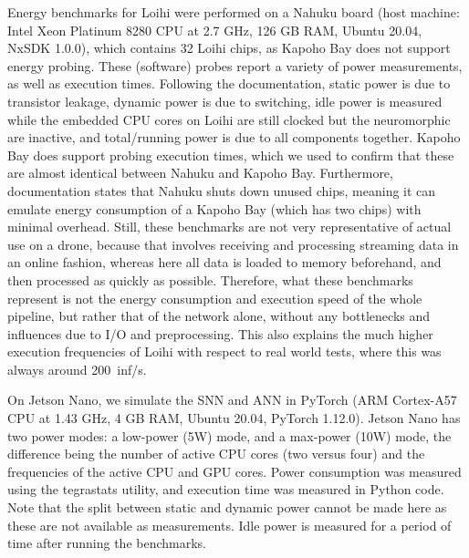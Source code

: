 Energy benchmarks for Loihi were performed on a Nahuku board (host machine: Intel Xeon Platinum 8280 CPU at 2.7 GHz, 126 GB RAM, Ubuntu 20.04, NxSDK 1.0.0), which contains 32 Loihi chips, as Kapoho Bay does not support energy probing. These (software) probes report a variety of power measurements, as well as execution times. Following the documentation, static power is due to transistor leakage, dynamic power is due to switching, idle power is measured while the embedded CPU cores on Loihi are still clocked but the neuromorphic are inactive, and total/running power is due to all components together. Kapoho Bay does support probing execution times, which we used to confirm that these are almost identical between Nahuku and Kapoho Bay. Furthermore, documentation states that Nahuku shuts down unused chips, meaning it can emulate energy consumption of a Kapoho Bay (which has two chips) with minimal overhead. Still, these benchmarks are not very representative of actual use on a drone, because that involves receiving and processing streaming data in an online fashion, whereas here all data is loaded to memory beforehand, and then processed as quickly as possible. Therefore, what these benchmarks represent is not the energy consumption and execution speed of the whole pipeline, but rather that of the network alone, without any bottlenecks and influences due to I/O and preprocessing. This also explains the much higher execution frequencies of Loihi with respect to real world tests, where this was always around 200~inf/s.

On Jetson Nano, we simulate the SNN and ANN in PyTorch (ARM Cortex-A57 CPU at 1.43 GHz, 4 GB RAM, Ubuntu 20.04, PyTorch 1.12.0). Jetson Nano has two power modes: a low-power (5W) mode, and a max-power (10W) mode, the difference being the number of active CPU cores (two versus four) and the frequencies of the active CPU and GPU cores. Power consumption was measured using the tegrastats utility, and execution time was measured in Python code. Note that the split between static and dynamic power cannot be made here as these are not available as measurements. Idle power is measured for a period of time after running the benchmarks.



